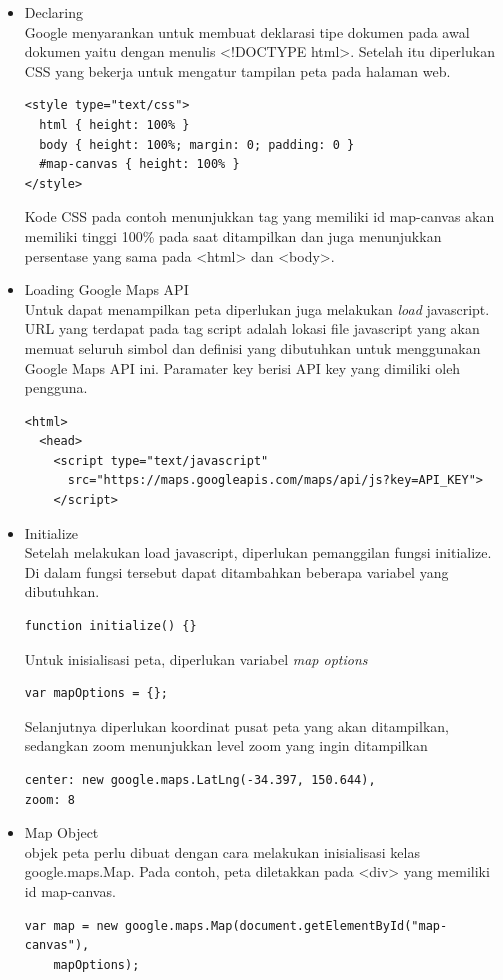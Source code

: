 \begin{itemize}
\item Declaring \\
Google menyarankan untuk membuat deklarasi tipe dokumen pada awal dokumen yaitu
dengan menulis <!DOCTYPE html>. Setelah itu diperlukan CSS yang bekerja untuk
mengatur tampilan peta pada halaman web.
\begin{verbatim}
<style type="text/css">
  html { height: 100% }
  body { height: 100%; margin: 0; padding: 0 }
  #map-canvas { height: 100% }
</style>
\end{verbatim}
Kode CSS pada contoh menunjukkan tag yang memiliki id map-canvas akan memiliki
tinggi 100\% pada saat ditampilkan dan juga menunjukkan persentase yang sama
pada <html> dan <body>.

\item Loading Google Maps API\\
Untuk dapat menampilkan peta diperlukan juga melakukan \textit{load} javascript.
URL yang terdapat pada tag script adalah lokasi file javascript yang akan memuat
seluruh simbol dan definisi yang dibutuhkan untuk menggunakan Google Maps API
ini. Paramater key berisi API key yang dimiliki oleh pengguna.
\begin{verbatim}
<html>
  <head>
    <script type="text/javascript"
      src="https://maps.googleapis.com/maps/api/js?key=API_KEY">
    </script>
\end{verbatim}

\item Initialize \\
Setelah melakukan load javascript, diperlukan pemanggilan fungsi initialize. Di
dalam fungsi tersebut dapat ditambahkan beberapa variabel yang dibutuhkan.
\begin{verbatim}
function initialize() {}
\end{verbatim}
Untuk inisialisasi peta, diperlukan variabel \textit{map options}
\begin{verbatim}
var mapOptions = {};
\end{verbatim}
Selanjutnya diperlukan koordinat pusat peta yang akan ditampilkan, sedangkan
zoom menunjukkan level zoom yang ingin ditampilkan
\begin{verbatim}
center: new google.maps.LatLng(-34.397, 150.644),
zoom: 8
\end{verbatim}

\item Map Object \\
objek peta perlu dibuat dengan cara melakukan inisialisasi kelas
google.maps.Map. Pada contoh, peta diletakkan pada <div> yang memiliki id
map-canvas.
\begin{verbatim}
var map = new google.maps.Map(document.getElementById("map-canvas"),
    mapOptions);
\end{verbatim}


\end{itemize}
